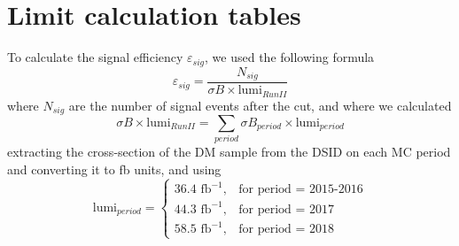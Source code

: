 \documentclass[12pt, a4paper]{book}
\begin{document}
\chapter{Limit calculation tables}\label{chap:Limit_Tabs}
To calculate the signal efficiency $\varepsilon_{sig}$, we used the following formula
$$
\varepsilon_{sig}=\frac{N_{sig}}{\sigma B \times \text{lumi}_{RunII}}
$$
where $N_{sig}$ are the number of signal events after the cut, and where we calculated 
$$
\sigma B \times \text{lumi}_{RunII} = \sum_{period}\sigma B_{period} \times \text{lumi}_{period}
$$
extracting the cross-section of the DM sample from the DSID on each MC period and converting it to fb units, and using
$$
\text{lumi}_{period} = \begin{cases}
               36.4\text{ fb}^{-1},& \text{for period = 2015-2016}\\
               44.3\text{ fb}^{-1},& \text{for  period = 2017}\\
               58.5\text{ fb}^{-1},& \text{for  period = 2018}
               \end{cases}
$$
\end{document}
